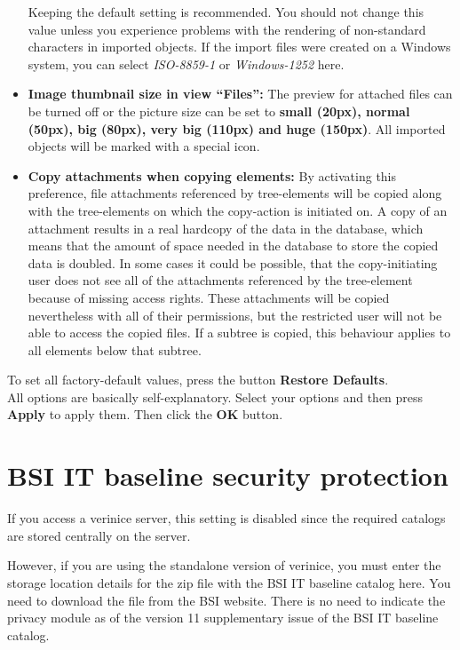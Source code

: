 \documentclass[a4paper,10pt]{book}
\begin{document}
\begin{itemize}
   Keeping the default setting is recommended. You should not change this value unless you experience problems
   with the rendering of non-standard characters in imported objects. If the import files were created on a
   Windows system, you can select {\em ISO-8859-1} or {\em Windows-1252} here.
\item \textbf{Image thumbnail size in view ``Files'':}
   The preview for attached files can be turned off or the picture size can be set to \textbf{small (20px), normal (50px), big (80px),
   very big (110px) and huge (150px)}.
   All imported objects will be marked with a special icon.
\item \textbf{Copy attachments when copying elements:}
By activating this preference, file attachments referenced by tree-elements
will be copied along with the tree-elements on which the copy-action is initiated on.
A copy of an attachment results in a real hardcopy of the data in the database,
which means that the amount of space needed in the database to store the
copied data is doubled.
In some cases it could be possible, that the copy-initiating user does not see all of the attachments
referenced by the tree-element because of missing access rights. These attachments will be copied nevertheless
with all of their permissions, but the restricted user will not be able to access the copied files.
If a subtree is copied, this behaviour applies to all elements below that subtree.
\end{itemize}
To set all factory-default values, press the button \textbf{Restore Defaults}.
\newline\\
All options are basically self-explanatory. Select your options and then press \textbf{Apply} to apply them. Then click the \textbf{OK} button.

\section{BSI IT baseline security protection}
If you access a verinice server, this setting is disabled since the required catalogs are stored centrally on the server.

However, if you are using the standalone version of verinice, you must enter the storage location details for the
zip file with the BSI IT baseline catalog here. You need to download the file from the BSI website. There is no need
to indicate the privacy module as of the version 11 supplementary issue of the BSI IT baseline catalog.
\end{document}
